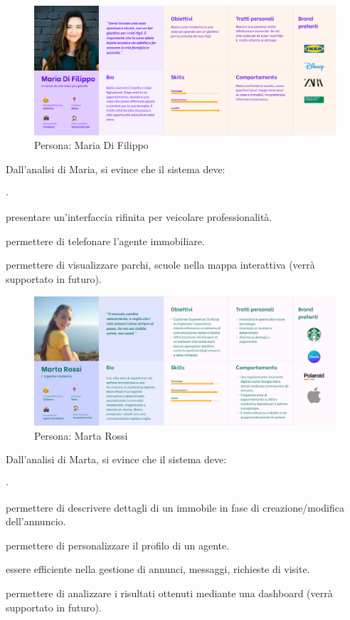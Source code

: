 \begin{figure}[h]
    \centering
    \includegraphics[width=\textwidth]{assets/personas/maria-di-filippo.png}
    \caption{Persona: Maria Di Filippo}
    \label{fig:maria-di-filippo}
\end{figure}

\noindent
Dall'analisi di Maria, si evince che il sistema deve:
\begin{list}{$\cdot$}{}
    \item presentare un'interfaccia rifinita per veicolare professionalità.
    \item permettere di telefonare l'agente immobiliare.
    \item permettere di visualizzare parchi, scuole nella mappa interattiva (verrà supportato in futuro).
\end{list}

\begin{figure}[h]
    \centering
    \includegraphics[width=\textwidth]{assets/personas/marta-rossi.png}
    \caption{Persona: Marta Rossi}
    \label{fig:marta-rossi}
\end{figure}

\noindent
Dall'analisi di Marta, si evince che il sistema deve:
\begin{list}{$\cdot$}{}
    \item permettere di descrivere dettagli di un immobile in fase di creazione/modifica dell'annuncio.
    \item permettere di personalizzare il profilo di un agente.
    \item essere efficiente nella gestione di annunci, messaggi, richieste di visite.
    \item permettere di analizzare i risultati ottenuti mediante una dashboard (verrà supportato in futuro).
\end{list}

